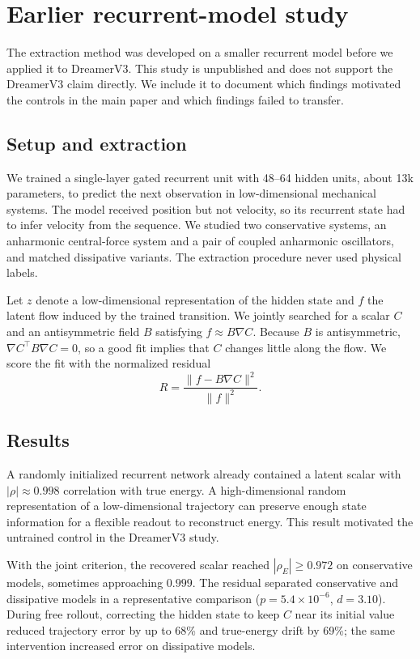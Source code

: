 \appendix
\section{Earlier recurrent-model study}
\label{sec:gru}

The extraction method was developed on a smaller recurrent model before we applied it to DreamerV3.
This study is unpublished and does not support the DreamerV3 claim directly. We include it to
document which findings motivated the controls in the main paper and which findings failed to
transfer.

\subsection{Setup and extraction}

We trained a single-layer gated recurrent unit with 48--64 hidden units, about 13k parameters, to
predict the next observation in low-dimensional mechanical systems. The model received position but
not velocity, so its recurrent state had to infer velocity from the sequence. We studied two
conservative systems, an anharmonic central-force system and a pair of coupled anharmonic
oscillators, and matched dissipative variants. The extraction procedure never used physical labels.

Let $z$ denote a low-dimensional representation of the hidden state and $f$ the latent flow induced
by the trained transition. We jointly searched for a scalar $C$ and an antisymmetric field $B$
satisfying $f \approx B\nabla C$. Because $B$ is antisymmetric, $\nabla C^\top B \nabla C = 0$, so a
good fit implies that $C$ changes little along the flow. We score the fit with the normalized
residual
\begin{equation*}
R = \frac{\|f - B\nabla C\|^2}{\|f\|^2}.
\end{equation*}

\subsection{Results}

A randomly initialized recurrent network already contained a latent scalar with
$|\rho| \approx 0.998$ correlation with true energy. A high-dimensional random representation of a
low-dimensional trajectory can preserve enough state information for a flexible readout to
reconstruct energy. This result motivated the untrained control in the DreamerV3 study.

With the joint criterion, the recovered scalar reached $|\rho_E| \ge 0.972$ on conservative models,
sometimes approaching $0.999$. The residual separated conservative and dissipative models in a
representative comparison ($p = 5.4\times10^{-6}$, $d = 3.10$). During free rollout, correcting the
hidden state to keep $C$ near its initial value reduced trajectory error by up to 68\% and
true-energy drift by 69\%; the same intervention increased error on dissipative models.

